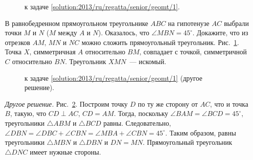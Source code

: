 \ifsolution
\begin{figure}\centering
    \caption{к задаче \ref{solution:2013/ru/regatta/senior/geomt/1}.}
    \label{fig:solution:2013/ru/regatta/senior/geomt/1}
\end{figure}
\fi %

\problem
В равнобедренном прямоугольном треугольнике $ABC$ на гипотенузе $AC$ выбрали
точки $M$ и $N$ ($M$ между $A$ и $N$).
Оказалось, что $\angle MBN = 45^\circ$.
Докажите, что из отрезков $AM$, $MN$ и $NC$ можно сложить прямоугольный
треугольник.
\solution
\label{solution:2013/ru/regatta/senior/geomt/1}%
Рис.~\ref{fig:solution:2013/ru/regatta/senior/geomt/1}.
Точка $X$, симметричная $A$ относительно $BM$, совпадает с точкой, симметричной
$C$ относительно $BN$.
Треугольник $XMN$~--- искомый.
\par
\begin{figure}\centering
    \caption{к задаче \ref{solution:2013/ru/regatta/senior/geomt/1}
        (другое решение).}
    \label{fig:solution:2013/ru/regatta/senior/geomt/1/another}
\end{figure}
\emph{Другое решение.}
Рис.~\ref{fig:solution:2013/ru/regatta/senior/geomt/1/another}.
Построим точку $D$ по ту же сторону от $AC$, что и точка $B$, такую, что
$CD \perp AC$, $CD = AM$.
Тогда, поскольку $\angle BAM = \angle BCD = 45^\circ$, треугольники
$\triangle ABM$ и $\triangle BCD$ равны.
Следовательно,
$\angle DBN = \angle DBC + \angle CBN = \angle MBA + \angle CBN = 45^\circ$.
Таким образом, равны треугольники $\triangle MBN$ и $\triangle DBN$ и
$DN = MN$.
Прямоугольный треугольник $\triangle DNC$ имеет нужные стороны.
\endproblem
